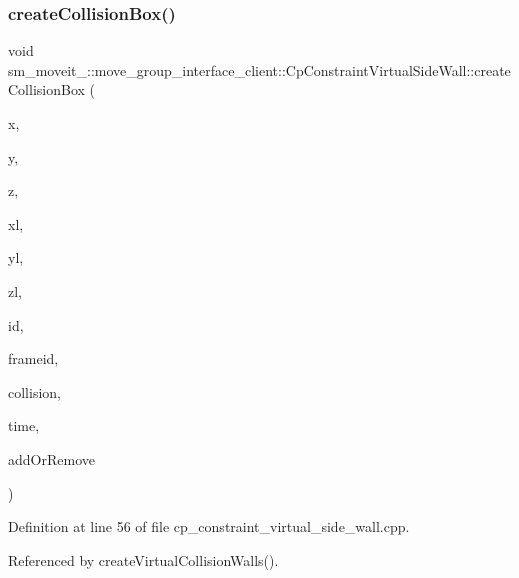 \subsubsection{\texorpdfstring{create\+Collision\+Box()}{createCollisionBox()}}
{\footnotesize\ttfamily void sm\+\_\+moveit\+\_\+::move\+\_\+group\+\_\+interface\+\_\+client\+::\+Cp\+Constraint\+Virtual\+Side\+Wall\+::create\+Collision\+Box (\begin{DoxyParamCaption}\item[{float}]{x,  }\item[{float}]{y,  }\item[{float}]{z,  }\item[{float}]{xl,  }\item[{float}]{yl,  }\item[{float}]{zl,  }\item[{std\+::string}]{id,  }\item[{std\+::string}]{frameid,  }\item[{moveit\+\_\+msgs\+::\+Collision\+Object \&}]{collision,  }\item[{const ros\+::\+Time \&}]{time,  }\item[{int}]{add\+Or\+Remove }\end{DoxyParamCaption})}



Definition at line 56 of file cp\+\_\+constraint\+\_\+virtual\+\_\+side\+\_\+wall.\+cpp.



Referenced by create\+Virtual\+Collision\+Walls().


